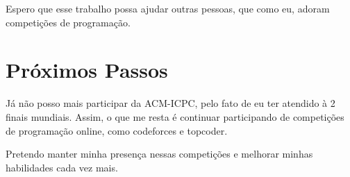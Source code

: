 \documentclass[
11pt, %
brazilian, %
singlespacing, %
]{MastersDoctoralThesis} %
\begin{document}
Espero que esse trabalho possa ajudar outras pessoas, que como eu, adoram competições de programação.


\section {Próximos Passos}
Já não posso mais participar da ACM-ICPC, pelo fato de eu ter atendido à 2 finais mundiais.
Assim, o que me resta é continuar participando de competições de programação online, como codeforces e topcoder.

Pretendo manter minha presença nessas competições e melhorar minhas habilidades cada vez mais. 
\clearpage
\end{document}
